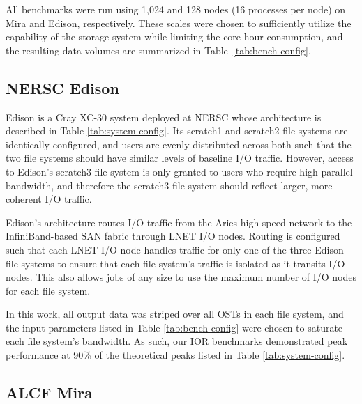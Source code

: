 All benchmarks were run using 1,024 and 128 nodes (16 processes per node) on Mira and Edison, respectively.
These scales were chosen to sufficiently utilize the capability of the storage system while limiting the core-hour consumption,
and the resulting data volumes are summarized in Table~\ref{tab:bench-config}.



\subsection{NERSC Edison} \label{sec:platforms/edison}

Edison is a Cray XC-30 system deployed at NERSC whose architecture is described in Table \ref{tab:system-config}.
Its scratch1 and scratch2 file systems are identically configured, and users are evenly distributed across both such that the two file systems should have similar levels of baseline I/O traffic.
However, access to Edison's scratch3 file system is only granted to users who require high parallel bandwidth, and therefore the scratch3 file system should reflect larger, more coherent I/O traffic.

Edison's architecture routes I/O traffic from the Aries high-speed network to the InfiniBand-based SAN fabric through LNET I/O nodes.
Routing is configured such that each LNET I/O node handles traffic for only one of the three Edison file systems to ensure that each file system's traffic is isolated as it transits I/O nodes.
This also allows jobs of any size to use the maximum number of I/O nodes for each file system.

In this work, all output data was striped over all OSTs in each file system, and the input parameters listed in Table \ref{tab:bench-config} were chosen to saturate each file system's bandwidth.
As such, our IOR benchmarks demonstrated peak performance at 90\% of the theoretical peaks listed in Table \ref{tab:system-config}.

\subsection{ALCF Mira} \label{sec:platforms/mira}


